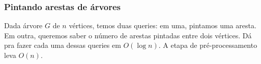 \subsubsection{Pintando arestas de árvores}

Dada árvore $G$ de $n$ vértices, temos duas queries: em uma, 
pintamos uma aresta. Em outra, queremos saber o número de arestas
pintadas entre dois vértices. Dá pra fazer cada uma dessas queries
em $O(\log n)$. A etapa de pré-processamento leva $O(n)$.

